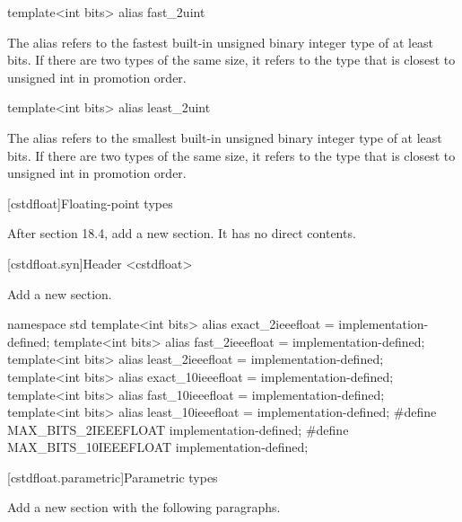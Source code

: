\begin{addedblock}
\begin{itemdecl}
template<int bits> alias fast_2uint    
\end{itemdecl}

\begin{itemdescr}
The alias  refers to the fastest built-in unsigned binary integer type of at least  bits. If there are two types of the same size, it refers to the type that is closest to unsigned int in promotion order.    
\end{itemdescr} 

\begin{itemdecl}
template<int bits> alias least_2uint    
\end{itemdecl}

\begin{itemdescr}
The alias  refers to the smallest built-in unsigned binary integer type of at least  bits. If there are two types of the same size, it refers to the type that is closest to unsigned int in promotion order.    
\end{itemdescr}    
\end{addedblock}

[cstdfloat]{Floating-point types}

After section 18.4, add a new section. It has no direct contents.

[cstdfloat.syn]{Header <cstdfloat>}

Add a new section.

\begin{addedblock}
    \begin{codeblock}
namespace std {
  template<int bits> alias exact_2ieeefloat = implementation-defined;
  template<int bits> alias fast_2ieeefloat = implementation-defined;
  template<int bits> alias least_2ieeefloat = implementation-defined;
  template<int bits> alias exact_10ieeefloat = implementation-defined;
  template<int bits> alias fast_10ieeefloat = implementation-defined;
  template<int bits> alias least_10ieeefloat = implementation-defined;
}
#define MAX_BITS_2IEEEFLOAT implementation-defined;
#define MAX_BITS_10IEEEFLOAT implementation-defined;
    \end{codeblock}    
\end{addedblock}

[cstdfloat.parametric]{Parametric types}

Add a new section with the following paragraphs.

